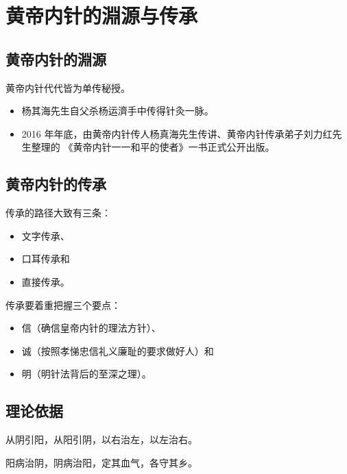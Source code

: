 \documentclass[
]{book}
\providecommand{\tightlist}{%
  \setlength{\itemsep}{0pt}\setlength{\parskip}{0pt}}
\begin{document}
\chapter{黄帝内针的淵源与传承}\label{ux9ec4ux5e1dux5185ux9488ux7684ux6df5ux6e90ux4e0eux4f20ux627f}

\section{黄帝内针的淵源}\label{ux9ec4ux5e1dux5185ux9488ux7684ux6df5ux6e90}

黄帝内针代代皆为单传秘授。

\begin{itemize}
\tightlist
\item
  杨其海先生自父杀杨运濟手中传得针灸一脉。
\item
  2016 年年底，由黄帝内针传人杨真海先生传讲、黄帝内针传承弟子刘力红先生整理的 《黄帝内针一一和平的使者》一书正式公开出版。
\end{itemize}

\section{黄帝内针的传承}\label{ux9ec4ux5e1dux5185ux9488ux7684ux4f20ux627f}

传承的路径大致有三条：

\begin{itemize}
\tightlist
\item
  文字传承、
\item
  口耳传承和
\item
  直接传承。
\end{itemize}

传承要着重把握三个要点：

\begin{itemize}
\tightlist
\item
  信（确信皇帝内针的理法方针）、
\item
  诚（按照孝悌忠信礼义廉耻的要求做好人）和
\item
  明（明针法背后的至深之理）。
\end{itemize}

\section{理论依据}\label{ux7406ux8bbaux4f9dux636e}

从阴引阳，从阳引阴，以右治左，以左治右。

阳病治阴，阴病治阳，定其血气，各守其乡。
\end{document}
